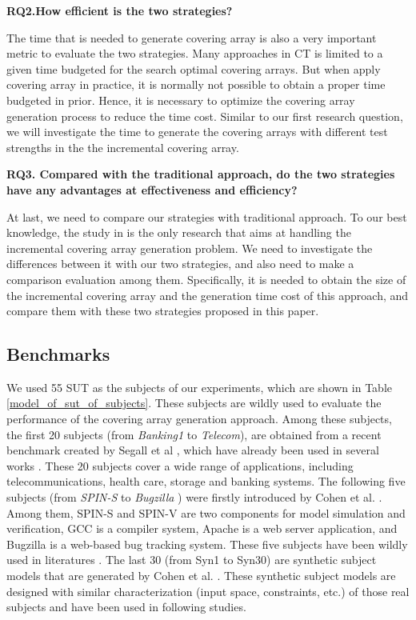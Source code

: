 \documentclass[conference]{IEEEtran}
\theoremstyle{definition}
\begin{document}
\textbf{RQ2.How efficient is the two strategies?}

The time that is needed to generate covering array is also a very important metric to evaluate the two strategies. Many approaches in CT is limited to a given time budgeted for the search optimal covering arrays.  But when apply covering array in practice, it is normally not possible to obtain a proper time budgeted in prior. Hence, it is necessary to optimize the covering array generation process to reduce the time cost. Similar to our first research question, we will investigate the time to generate the covering arrays with different test strengths in the the incremental covering array.

\textbf{RQ3. Compared with the traditional approach, do the two strategies have any advantages at effectiveness and efficiency?}

At last, we need to compare our strategies with traditional approach. To our best knowledge, the study in \cite{fouche2009incremental} is the only research that aims at handling the incremental covering array generation problem. We need to investigate the differences between it with our two strategies, and also need to make a comparison evaluation among them. Specifically, it is needed to obtain the size of the incremental covering array and the generation time cost of this approach, and compare them with these two strategies proposed in this paper.


\subsection{Benchmarks}
We used 55 SUT as the subjects of our experiments, which are shown in Table \ref{model_of_sut_of_subjects}. These subjects are wildly used to evaluate the performance of the covering array generation approach. Among these subjects, the first 20 subjects (from \emph{Banking1} to \emph{Telecom}), are obtained from a recent benchmark created by Segall et al \cite{segall2011using}, which have already been used in several works \cite{jia2015learning,choi2016distance}. These 20 subjects cover a wide range of applications, including telecommunications, health care, storage and banking systems.  The following five subjects (from \emph{SPIN-S}  to \emph{Bugzilla} ) were firstly introduced by Cohen et al. \cite{cohen2007interaction,cohen2008constructing}. Among them, SPIN-S and SPIN-V are two components for model simulation and verification, GCC is a compiler system, Apache is a web server application, and Bugzilla is a web-based bug tracking system. These five subjects have been wildly used in literatures \cite{kuhn2006pseudo,cohen2007interaction,cohen2008constructing,garvin2009improved,garvin2011evaluating,lin2015tca,choi2016distance}. The last 30 (from Syn1 to Syn30) are synthetic subject models that are generated by Cohen et al. \cite{cohen2008constructing}. These synthetic subject models are designed with similar characterization (input space, constraints, etc.) of those real subjects and have been used in following studies\cite{garvin2009improved,garvin2011evaluating,lin2015tca,choi2016distance}.
\end{document}
